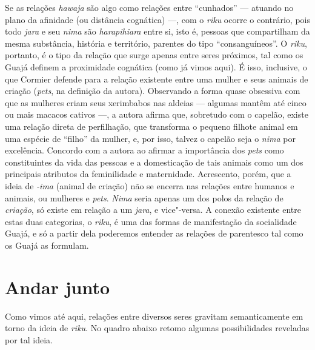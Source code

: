 Se as relações \emph{hawaja} são algo como relações entre ``cunhados'' ---
atuando no plano da afinidade (ou distância cognática) ---, com o
\emph{riku} ocorre o contrário, pois todo \emph{jara} e seu \emph{nima}
são \emph{harapihiara} entre si, isto é, pessoas que compartilham da
mesma substância, história e território, parentes do tipo
``consanguíneos''. O \emph{riku}, portanto, é o tipo da relação que surge
apenas entre seres próximos, tal como os Guajá definem a proximidade
cognática (como já vimos aqui). É isso, inclusive, o que Cormier defende
para a relação existente entre uma mulher e seus animais de criação
(\emph{pets}, na definição da autora). Observando a forma quase
obsessiva com que as mulheres criam seus xerimbabos nas aldeias ---
algumas mantêm até cinco ou mais macacos cativos ---, a autora afirma que,
sobretudo com o capelão, existe uma relação direta de perfilhação, que
transforma o pequeno filhote animal em uma espécie de ``filho'' da mulher,
e, por isso, talvez o capelão seja o \emph{nima} por excelência.
Concordo com a autora ao afirmar a importância dos \emph{pets} como
constituintes da vida das pessoas e a domesticação de tais animais como
um dos principais atributos da feminilidade e maternidade. Acrescento,
porém, que a ideia de \emph{-ima} (animal de criação) não se encerra nas
relações entre humanos e animais, ou mulheres e \emph{pets}. \emph{Nima}
seria apenas um dos polos da relação de \emph{criação}, só existe em
relação a um \emph{jara}, e vice"-versa. A conexão existente entre estas
duas categorias, o \emph{riku}, é uma das formas de manifestação da
socialidade Guajá, e só a partir dela poderemos entender as relações de
parentesco tal como os Guajá as formulam.

\section{Andar junto}

Como vimos até aqui, relações entre diversos seres gravitam
semanticamente em torno da ideia de \emph{riku}. No quadro abaixo retomo
algumas possibilidades reveladas por tal ideia.

